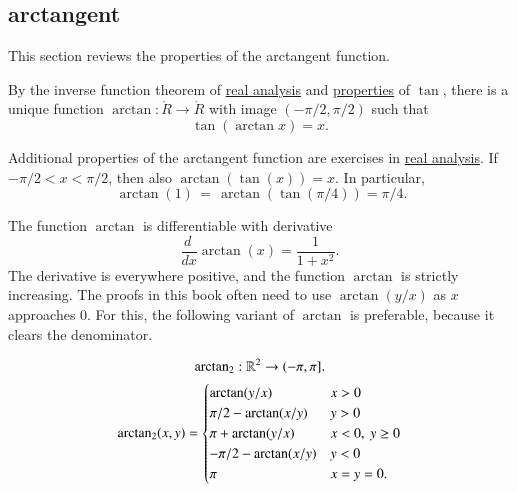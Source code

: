 \subsection{arctangent}

This section reviews the properties of the arctangent function.  

\begin{definition}[arctangent]\label{def:arctan}
  By the inverse function theorem of \hyperref[back:analysis]{real
    analysis} and \hyperref[lemma:tan-monotone]{properties} of $\tan$,
  there is a unique function $\arctan:\ring{R}\to\ring{R}$ with image
  $(-\pi/2,\pi/2)$ such that
\begin{equation}\label{eqn:tanarctan}\tan(\arctan x) =x.\end{equation}
%
\end{definition}

Additional properties of the arctangent function are exercises in
\hyperref[back:analysis]{real analysis}.  If $-\pi/2 < x < \pi/2$,
then also $\arctan(\tan(x)) = x$. In particular,%
\begin{equation}\label{eqn:arctan-1}\
\arctan(1) \hyperref[lemma:tan-pi4]{\,=\,} \arctan(\tan(\pi/4)) = \pi/4.
\end{equation}


The function $\arctan$ is differentiable with derivative%
\begin{equation}\label{eqn:deriv-tan}\frac{d\phantom{~}} {dx} \arctan(x) = \frac{1}{1 +
    x^2}.\end{equation}
The derivative is everywhere positive, and the function $\arctan$ is
strictly increasing.
%
The proofs in this book often need to use $\arctan(y/x)$ as  $x$ approaches $0$.
For this, the following variant of $\arctan$ is preferable, because it clears the denominator.


\begin{definition}[$\atn$]\label{def:atn}
\begin{displaymath}
{\operatorname{arctan\ensuremath{_2}}}: \mathbb{R}^2 \to (-\pi,\pi].
\end{displaymath}
\begin{displaymath}
{\operatorname{arctan\ensuremath{_2}}}(x,y) = \begin{cases}
\arctan(y/x) & x > 0\\
\pi/2- \arctan(x/y) & y > 0 \\
\pi + \arctan(y/x) & x< 0,\  y\ge 0\\
-\pi/2- \arctan(x/y) & y< 0 \\
\pi & x= y=0.\\
\end{cases}
\end{displaymath}
\end{definition}
%
%


